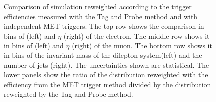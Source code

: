 \begin{figure}[htbp!]
\begin{center}
      \caption{Comparison of \ttbar simulation reweighted according to the trigger efficiencies measured with the Tag and Probe method and with independent MET triggers.
       The top row shows the comparison in bins of \pt (left) and $\eta$ (right) of the electron. The middle row shows it in bins of \pt (left) and $\eta$ (right) of the muon. The bottom row shows it in bins of the invariant mass of the dilepton system(left) and the number of jets (right). The uncertainties shown are statistical. The lower panels show the ratio of the distribution reweighted with the efficiency from the MET trigger method divided by the distribution reweighted by the Tag and Probe method. }  
    \label{fig:Clos_emu}
  \end{center}
\end{figure}



